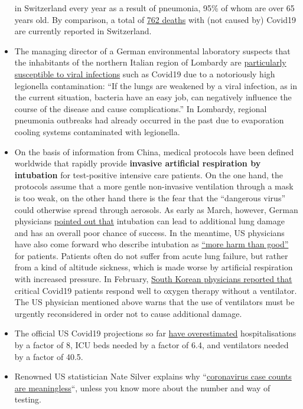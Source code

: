 \begin{itemize}
  in Switzerland every year as a result of pneumonia, 95\% of whom are
  over 65 years old. By comparison, a total of
  \href{https://www.corona-data.ch/}{762 deaths} with (not caused by)
  Covid19 are currently reported in Switzerland.
\item
  The managing director of a German environmental laboratory suspects
  that the inhabitants of the northern Italian region of Lombardy are
  \href{https://m.apotheke-adhoc.de/nachrichten/detail/coronavirus/erhoehen-legionellen-die-todesrate-einer-corona-infektion/}{particularly
  susceptible to viral infections} such as Covid19 due to a notoriously
  high legionella contamination: ``If the lungs are weakened by a viral
  infection, as in the current situation, bacteria have an easy job, can
  negatively influence the course of the disease and cause
  complications.'' In Lombardy, regional pneumonia outbreaks had already
  occurred in the past due to evaporation cooling systems contaminated
  with legionella.
\item
  On the basis of information from China, medical protocols have been
  defined worldwide that rapidly provide \textbf{invasive artificial
  respiration by intubation} for test-positive intensive care patients.
  On the one hand, the protocols assume that a more gentle non-invasive
  ventilation through a mask is too weak, on the other hand there is the
  fear that the ``dangerous virus'' could otherwise spread through
  aerosols. As early as March, however, German physicians
  \href{https://www.doccheck.com/de/detail/articles/26271-covid-19-beatmung-und-dann}{pointed
  out that} intubation can lead to additional lung damage and has an
  overall poor chance of success. In the meantime, US physicians have
  also come forward who describe intubation as
  \href{https://www.youtube.com/watch?v=k9GYTc53r2o}{``more harm than
  good''} for patients. Patients often do not suffer from acute lung
  failure, but rather from a kind of altitude sickness, which is made
  worse by artificial respiration with increased pressure. In February,
  \href{https://www.upi.com/Top_News/World-News/2020/02/14/Oxygen-therapy-working-for-coronavirus-patient-Seoul-says/6651581696794/}{South
  Korean physicians reported that} critical Covid19 patients respond
  well to oxygen therapy without a ventilator. The US physician
  mentioned above warns that the use of ventilators must be urgently
  reconsidered in order not to cause additional damage.
\item
  The official US Covid19 projections so far
  \href{https://twitter.com/NikolovScience/status/1246823479820693505}{have
  overestimated} hospitalisations by a factor of 8, ICU beds needed by a
  factor of 6.4, and ventilators needed by a factor of 40.5.
\item
  Renowned US statistician Nate Silver explains why
  ``\href{https://fivethirtyeight.com/features/coronavirus-case-counts-are-meaningless/}{coronavirus
  case counts are meaningless}``, unless you know more about the number
  and way of testing.
\end{itemize}

